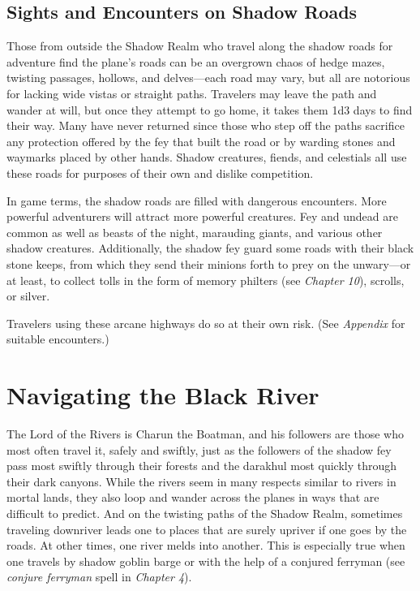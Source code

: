 \documentclass[10pt,a4paper,twoside,bg=print,twocolumn,openany,nodeprecatedcode]{dndbook}
\begin{document}
\subsection{Sights and Encounters on Shadow Roads}
Those from outside the Shadow Realm who travel along the shadow roads for adventure find the plane's roads can be an overgrown chaos of hedge mazes, twisting passages, hollows, and delves—each road may vary, but all are notorious for lacking wide vistas or straight paths. Travelers may leave the path and wander at will, but once they attempt to go home, it takes them 1d3 days to find their way. Many have never returned since those who step off the paths sacrifice any protection offered by the fey that built the road or by warding stones and waymarks placed by other hands. Shadow creatures, fiends, and celestials all use these roads for purposes of their own and dislike competition.

In game terms, the shadow roads are filled with dangerous encounters. More powerful adventurers will attract more powerful creatures. Fey and undead are common as well as beasts of the night, marauding giants, and various other shadow creatures. Additionally, the shadow fey guard some roads with their black stone keeps, from which they send their minions forth to prey on the unwary—or at least, to collect tolls in the form of memory philters (see \textit{Chapter 10}), scrolls, or silver.

Travelers using these arcane highways do so at their own risk. (See \textit{Appendix} for suitable encounters.)

\section{Navigating the Black River}
The Lord of the Rivers is Charun the Boatman, and his followers are those who most often travel it, safely and swiftly, just as the followers of the shadow fey pass most swiftly through their forests and the darakhul most quickly through their dark canyons. While the rivers seem in many respects similar to rivers in mortal lands, they also loop and wander across the planes in ways that are difficult to predict. And on the twisting paths of the Shadow Realm, sometimes traveling downriver leads one to places that are surely upriver if one goes by the roads. At other times, one river melds into another. This is especially true when one travels by shadow goblin barge or with the help of a conjured ferryman (see \textit{conjure ferryman} spell in \textit{Chapter 4}).
\end{document}
